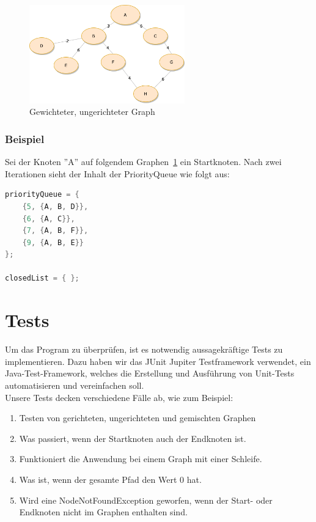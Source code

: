 \documentclass[a4paper]{article}
\begin{document}
\begin{figure}[htbp]
	\centering
		\includegraphics[width=0.60\textwidth]{Figs/Beispielgraph_2.png}		
	\caption{Gewichteter, ungerichteter Graph}
	\label{fig:beispielgraph_2}
\end{figure}

\subsubsection{Beispiel}

Sei der Knoten ''A'' auf folgendem Graphen~\ref{fig:beispielgraph_2} ein Startknoten.
Nach zwei Iterationen sieht der Inhalt der PriorityQueue wie folgt aus:\\

\begin{lstlisting}[language = java, frame = trBL]
priorityQueue = {
    {5, {A, B, D}},
    {6, {A, C}},
    {7, {A, B, F}},
    {9, {A, B, E}}
};

closedList = { };
\end{lstlisting}

\newpage

\section{Tests}

Um das Program zu überprüfen, ist es notwendig aussagekräftige Tests zu implementieren. Dazu haben wir das JUnit Jupiter Testframework verwendet, ein Java-Test-Framework, welches die Erstellung und Ausführung von Unit-Tests automatisieren und vereinfachen soll.\\

Unsere Tests decken verschiedene Fälle ab, wie zum Beispiel:

\begin{enumerate}
    \item Testen von gerichteten, ungerichteten und gemischten Graphen
    \item Was passiert, wenn der Startknoten auch der Endknoten ist.
    \item Funktioniert die Anwendung bei einem Graph mit einer Schleife.
    \item Was ist, wenn der gesamte Pfad den Wert 0 hat.
    \item Wird eine NodeNotFoundException geworfen, wenn der Start- oder Endknoten nicht im Graphen enthalten sind.
\end{enumerate}
\end{document}

